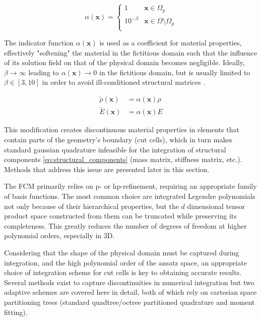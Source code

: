 \begin{equation} \label{eq:indicator_function}
	\alpha (\mathbf x) = \left\{
	\begin{array}{ll}
		1 & \mathbf x \in \Omega_p \\
		10^{-\beta} & \mathbf x \in \Omega \setminus \Omega_p \\
	\end{array}
	\right.
\end{equation}


The indicator function $\alpha(\mathbf x)$ is used as a coefficient for material properties, effectively "softening" the material in the fictitious domain such that the influence of its solution field on that of the physical domain becomes negligible.
Ideally, $\beta \to \infty$ leading to $\alpha (\mathbf x) \to 0$ in the fictitious domain, but is usually limited to $\beta \in [3,10]$ in order to avoid ill-conditioned structural matrices \cite{Parvizian2007}.

\begin{equation} \label{eq:fictitious_material_properties}
	\begin{array}{ll}
	\tilde \rho (\mathbf x) &= \alpha (\mathbf x) \rho \\
	\tilde E(\mathbf x) &= \alpha (\mathbf x) E
	\end{array}
\end{equation}

This modification creates discontinuous material properties in
elements that contain parts of the geometry's boundary (cut cells), which
in turn makes standard gaussian quadrature infeasible for the integration
of structural components \ref{eq:structural_components} (mass matrix, stiffness matrix, etc.). Methods that address this issue are presented later in this section.

The FCM primarily relies on p- or hp-refinement, requiring an appropriate family of basis functions. The most common choice are integrated Legendre polynomials \cite{Duester2007} not only because of their hierarchical properties, but the $d$ dimensional tensor product space constructed from them can be truncated while preserving its completeness. This greatly reduces the number of degrees of freedom at higher polynomial orders, especially in 3D.

Considering that the shape of the physical domain must be captured during integration, and the high polynomial order of the ansatz space, an appropriate choice of integration scheme for cut cells is key to obtaining accurate results. Several methods exist
to capture discontinuities in numerical integration but two adaptive schemes are covered here in detail,
both of which rely on cartesian space partitioning trees (standard quadtree/octree partitioned
quadrature and moment fitting).

